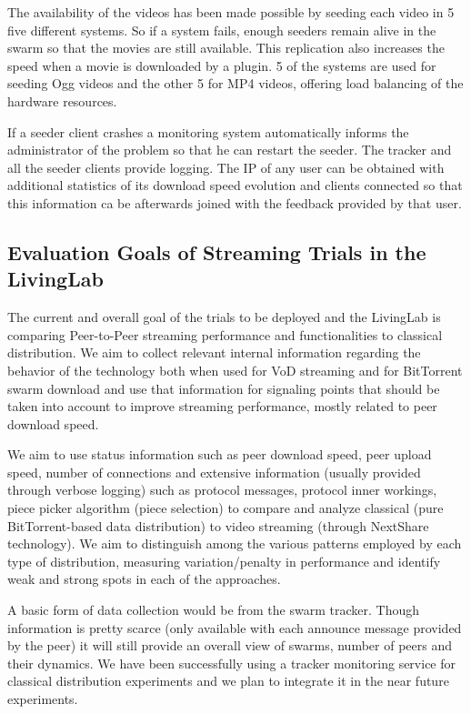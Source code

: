 The availability of the videos has been made possible by seeding each video in
5 five different systems. So if a system fails, enough seeders remain alive in
the swarm so that the movies are still available. This replication also
increases the speed when a movie is downloaded by a plugin. 5 of the systems
are used for seeding Ogg videos and the other 5 for MP4 videos, offering load
balancing of the hardware resources.

If a seeder client crashes a monitoring system automatically informs the
administrator of the problem so that he can restart the seeder. The tracker
and all the seeder clients provide logging. The IP of any user can be obtained
with additional statistics of its download speed evolution and clients
connected so that this information ca be afterwards joined with the feedback
provided by that user.

\subsection{Evaluation Goals of Streaming Trials in the LivingLab}
\label{subsec:multimedia-dist:evaluation-goals}

The current and overall goal of the trials to be deployed and the LivingLab is
comparing Peer-to-Peer streaming performance and functionalities to
classical distribution. We aim to collect relevant internal information
regarding the behavior of the technology both when used for VoD streaming and
for BitTorrent swarm download and use that information for signaling points
that should be taken into account to improve streaming performance, mostly
related to peer download speed.

We aim to use status information such as peer download speed, peer upload
speed, number of connections and extensive information (usually provided
through verbose logging) such as protocol messages, protocol inner workings,
piece picker algorithm (piece selection) to compare and analyze classical
(pure BitTorrent-based data distribution) to video streaming (through
NextShare technology). We aim to distinguish among the various patterns
employed by each type of distribution, measuring variation/penalty in
performance and identify weak and strong spots in each of the approaches.

A basic form of data collection would be from the swarm tracker. Though
information is pretty scarce (only available with each announce message
provided by the peer) it will still provide an overall view of swarms, number
of peers and their dynamics. We have been successfully using a tracker
monitoring service for classical distribution experiments and we plan to
integrate it in the near future experiments.

